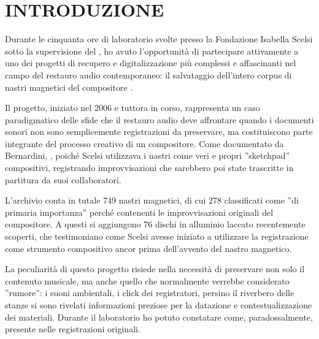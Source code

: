 
\section{INTRODUZIONE}
Durante le cinquanta ore di laboratorio svolte presso la Fondazione Isabella Scelsi sotto la supervisione del , ho avuto l'opportunità di partecipare attivamente a uno dei progetti di recupero e digitalizzazione più complessi e affascinanti nel campo del restauro audio contemporaneo: il salvataggio dell'intero corpus di nastri magnetici del compositore .

Il progetto, iniziato nel 2006 e tuttora in corso, rappresenta un caso paradigmatico delle sfide che il restauro audio deve affrontare quando i documenti sonori non sono semplicemente registrazioni da preservare, ma costituiscono parte integrante del processo creativo di un compositore. Come documentato da Bernardini, , poiché Scelsi utilizzava i nastri come veri e propri ''sketchpad'' compositivi, registrando improvvisazioni che sarebbero poi state trascritte in partitura da suoi collaboratori.

L'archivio conta in tutale 749 nastri magnetici, di cui 278 classificati come ''di primaria importanza'' perché contenenti le improvvisazioni originali del compositore\cite{Bernardini2012themul}. A questi si aggiungono 76 dischi in alluminio laccato recentemente scoperti, che testimoniano come Scelsi avesse iniziato a utilizzare la registrazione come strumento compositivo ancor prima dell'avvento del nastro magnetico\cite[p. 185]{Bernardini2012themul}.

La peculiarità di questo progetto risiede nella necessità di preservare non solo il contenuto musicale, ma anche quello che normalmente verrebbe considerato ''rumore'': i suoni ambientali, i click dei registratori, persino il riverbero delle stanze si sono rivelati informazioni preziose per la datazione e contestualizzazione dei materiali. Durante il laboratorio ho potuto constatare come, paradossalmente,  presente nelle registrazioni originali.

